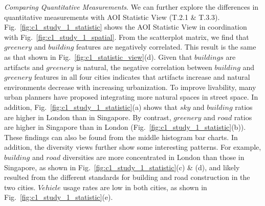 \vspace*{2mm}
\noindent
\textit{Comparing Quantitative Measurements}.
We can further explore the differences in quantitative measurements with AOI Statistic View (T.2.1 \& T.3.3).
Fig.~\ref{fig:c1_study_1_statistic} shows the AOI Statistic View in coordination with Fig.~\ref{fig:c1_study_1_spatial}.
From the scatterplot matrix, we find that $greenery$ and $building$ features are negatively correlated.
This result is the same as that shown in Fig.~\ref{fig:c1_statistic_view}(d).
Given that $buildings$ are artifacts and $greenery$ is natural, the negative correlation between $building$ and $greenery$ features in all four cities indicates that artifacts increase and natural environments decrease with increasing urbanization.
To improve livability, many urban planners have proposed integrating more natural spaces in street space.
In addition, Fig.~\ref{fig:c1_study_1_statistic}(a) shows that $sky$ and $building$ ratios are higher in London than in Singapore.
By contrast, $greenery$ and $road$ ratios are higher in Singapore than in London (Fig.~\ref{fig:c1_study_1_statistic}(b)).
These findings can also be found from the middle histogram bar charts.
In addition, the diversity views further show some interesting patterns.
For example, $building$ and $road$ diversities are more concentrated in London than those in Singapore, as shown in Fig.~\ref{fig:c1_study_1_statistic}(c) \& (d), and likely resulted from the different standards for building and road construction in the two cities.
$Vehicle$ usage rates are low in both cities, as shown in Fig.~\ref{fig:c1_study_1_statistic}(e).


